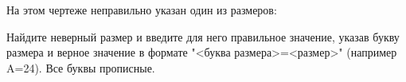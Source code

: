 
На этом чертеже неправильно указан один из размеров:


Найдите неверный размер и введите для него правильное значение, указав букву размера и верное значение в формате "<буква размера>=<размер>" (например A=24).
Все буквы прописные.

